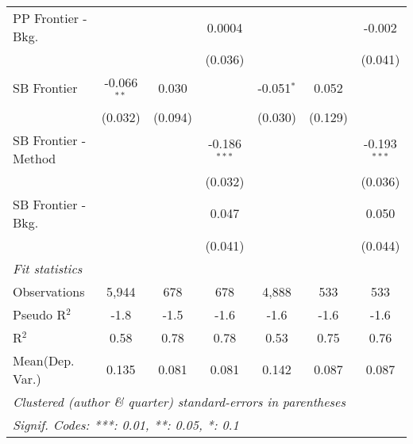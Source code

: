\begin{tabular}{lcccccc}
   PP Frontier - Bkg.   &               &             & 0.0004         &              &              & -0.002\\   
                        &               &             & (0.036)        &              &              & (0.041)\\   
   SB Frontier          & -0.066$^{**}$ & 0.030       &                & -0.051$^{*}$ & 0.052        &   \\   
                        & (0.032)       & (0.094)     &                & (0.030)      & (0.129)      &   \\   
   SB Frontier - Method &               &             & -0.186$^{***}$ &              &              & -0.193$^{***}$\\   
                        &               &             & (0.032)        &              &              & (0.036)\\   
   SB Frontier - Bkg.   &               &             & 0.047          &              &              & 0.050\\   
                        &               &             & (0.041)        &              &              & (0.044)\\   
   \midrule
   \emph{Fit statistics}\\
   Observations         & 5,944         & 678         & 678            & 4,888        & 533          & 533\\  
   Pseudo R$^2$         & -1.8          & -1.5        & -1.6           & -1.6         & -1.6         & -1.6\\  
   R$^2$                & 0.58          & 0.78        & 0.78           & 0.53         & 0.75         & 0.76\\  
Mean(Dep. Var.) & 0.135 & 0.081 & 0.081 & 0.142 & 0.087 & 0.087 \\
   \midrule \midrule
   \multicolumn{7}{l}{\emph{Clustered (author \& quarter) standard-errors in parentheses}}\\
   \multicolumn{7}{l}{\emph{Signif. Codes: ***: 0.01, **: 0.05, *: 0.1}}\\
\end{tabular}
\par\endgroup
